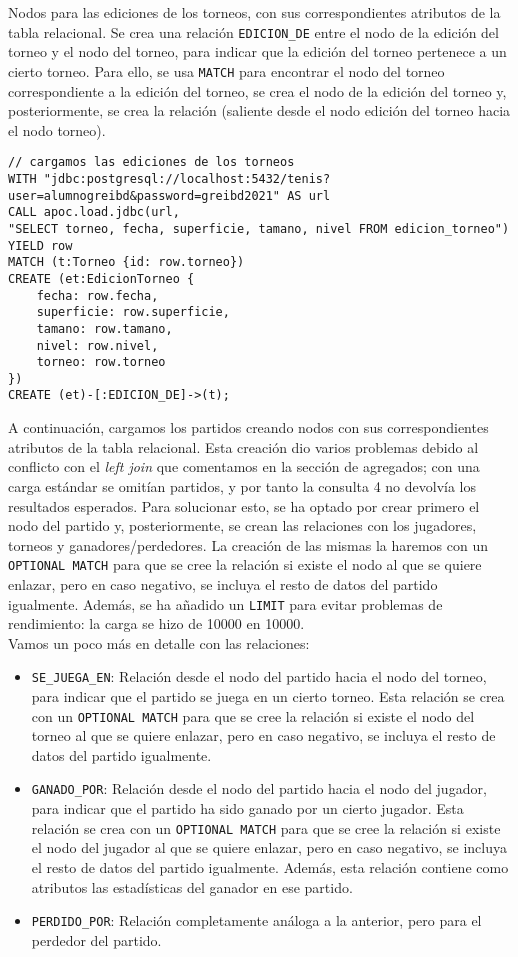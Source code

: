 Nodos para las ediciones de los torneos, con sus correspondientes atributos de la tabla relacional. Se crea una relación \texttt{EDICION\_DE} entre el nodo de la edición del torneo y el nodo del torneo, para indicar que la edición del torneo pertenece a un cierto torneo. Para ello, se usa \texttt{MATCH} para encontrar el nodo del torneo correspondiente a la edición del torneo, se crea el nodo de la edición del torneo y, posteriormente, se crea la relación (saliente desde el nodo edición del torneo hacia el nodo torneo).

\begin{lstlisting}[language=Cypher]
// cargamos las ediciones de los torneos
WITH "jdbc:postgresql://localhost:5432/tenis?user=alumnogreibd&password=greibd2021" AS url
CALL apoc.load.jdbc(url,
"SELECT torneo, fecha, superficie, tamano, nivel FROM edicion_torneo") YIELD row
MATCH (t:Torneo {id: row.torneo})
CREATE (et:EdicionTorneo {
    fecha: row.fecha,
    superficie: row.superficie,
    tamano: row.tamano,
    nivel: row.nivel,
    torneo: row.torneo
})
CREATE (et)-[:EDICION_DE]->(t);
\end{lstlisting}

A continuación, cargamos los partidos creando nodos con sus correspondientes atributos de la tabla relacional. Esta creación dio varios problemas debido al conflicto con el \textit{left join} que comentamos en la sección de agregados; con una carga estándar se omitían partidos, y por tanto la consulta 4 no devolvía los resultados esperados. Para solucionar esto, se ha optado por crear primero el nodo del partido y, posteriormente, se crean las relaciones con los jugadores, torneos y ganadores/perdedores. La creación de las mismas la haremos con un \texttt{OPTIONAL MATCH} para que se cree la relación si existe el nodo al que se quiere enlazar, pero en caso negativo, se incluya el resto de datos del partido igualmente. Además, se ha añadido un \texttt{LIMIT} para evitar problemas de rendimiento: la carga se hizo de 10000 en 10000. \\

\noindent Vamos un poco más en detalle con las relaciones:
\begin{itemize}
\item \texttt{SE\_JUEGA\_EN}: Relación desde el nodo del partido hacia el nodo del torneo, para indicar que el partido se juega en un cierto torneo. Esta relación se crea con un \texttt{OPTIONAL MATCH} para que se cree la relación si existe el nodo del torneo al que se quiere enlazar, pero en caso negativo, se incluya el resto de datos del partido igualmente.
\item \texttt{GANADO\_POR}: Relación desde el nodo del partido hacia el nodo del jugador, para indicar que el partido ha sido ganado por un cierto jugador. Esta relación se crea con un \texttt{OPTIONAL MATCH} para que se cree la relación si existe el nodo del jugador al que se quiere enlazar, pero en caso negativo, se incluya el resto de datos del partido igualmente. Además, esta relación contiene como atributos las estadísticas del ganador en ese partido. 
\item \texttt{PERDIDO\_POR}: Relación completamente análoga a la anterior, pero para el perdedor del partido.
\end{itemize}

